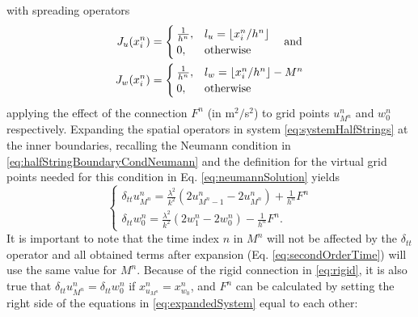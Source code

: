 with spreading operators
\begin{equation}\label{eq:spreadingOperators}
    \begin{aligned}
    J_u(x_i^n)& =
    \begin{cases}
        \frac{1}{h^n}, & {l_u} = \lfloor x_i^n/h^n\rfloor\\
        0,& \text{otherwise}
    \end{cases}
    \quad\text{and}\\
    J_w(x_i^n) &=
    \begin{cases}
        \frac{1}{h^n}, & {l_w} = \lfloor x_i^n/h^n \rfloor - M^n\\
        0,& \text{otherwise}
    \end{cases}
\end{aligned}
\end{equation}
 applying the effect of the connection %
$F^n$ (in m$^2/$s$^2$) to grid points $u_{M^n}^n$ and $w_0^n$ respectively.
%
Expanding the spatial operators in system \eqref{eq:systemHalfStrings} at the inner boundaries, recalling the Neumann condition in  \eqref{eq:halfStringBoundaryCondNeumann} and the definition for the virtual grid points needed for this condition in Eq. \eqref{eq:neumannSolution} yields
\begin{equation}\label{eq:expandedSystem}
    \begin{cases}
        \delta_{tt}u_{M^n}^n = \frac{\lambda^2}{k^2}(2u_{M^n-1}^n-2u_{M^n}^n) + \frac{1}{h^n}F^n\\
        \delta_{tt}w_0^n = \frac{\lambda^2}{k^2}(2w_1^n-2w_0^n) - \frac{1}{h^n}F^n.
    \end{cases}
\end{equation}
It is important to note that the time index $n$ in $M^n$ will not be affected by the $\delta_{tt}$ operator and all obtained terms after expansion (Eq. \eqref{eq:secondOrderTime}) will use the same value for $M^n$. Because of the rigid connection in \eqref{eq:rigid}, it is also true that $\delta_{tt}u_{M^n}^n = \delta_{tt}w_0^n$ if $x_{u_{M^n}}^n = x_{w_0}^n$, and $F^n$ can be calculated by setting the right side of the equations in \eqref{eq:expandedSystem} equal to each other:
